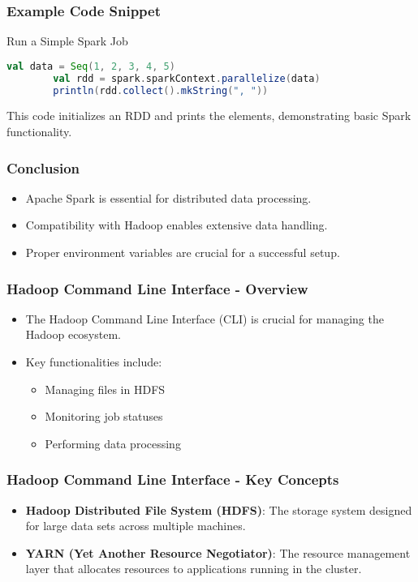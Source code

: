 \documentclass[aspectratio=169]{beamer}
\begin{document}
\begin{frame}[fragile]
    \frametitle{Example Code Snippet}
    \begin{block}{Run a Simple Spark Job}
        \begin{lstlisting}[language=Scala]
        val data = Seq(1, 2, 3, 4, 5)
        val rdd = spark.sparkContext.parallelize(data)
        println(rdd.collect().mkString(", "))
        \end{lstlisting}
    \end{block}
    This code initializes an RDD and prints the elements, demonstrating basic Spark functionality.
\end{frame}

\begin{frame}[fragile]
    \frametitle{Conclusion}
    \begin{itemize}
        \item Apache Spark is essential for distributed data processing.
        \item Compatibility with Hadoop enables extensive data handling.
        \item Proper environment variables are crucial for a successful setup.
    \end{itemize}
\end{frame}

\begin{frame}[fragile]
    \frametitle{Hadoop Command Line Interface - Overview}
    \begin{itemize}
        \item The Hadoop Command Line Interface (CLI) is crucial for managing the Hadoop ecosystem.
        \item Key functionalities include:
        \begin{itemize}
            \item Managing files in HDFS
            \item Monitoring job statuses
            \item Performing data processing
        \end{itemize}
    \end{itemize}
\end{frame}

\begin{frame}[fragile]
    \frametitle{Hadoop Command Line Interface - Key Concepts}
    \begin{itemize}
        \item \textbf{Hadoop Distributed File System (HDFS)}: 
        The storage system designed for large data sets across multiple machines.
        
        \item \textbf{YARN (Yet Another Resource Negotiator)}:
        The resource management layer that allocates resources to applications running in the cluster.
    \end{itemize}
\end{frame}
\end{document}
